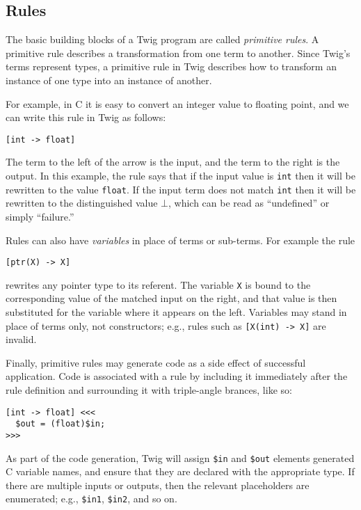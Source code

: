 \subsection{Rules}

The basic building blocks of a Twig program are called \emph{primitive rules}. A primitive rule describes a transformation from one term to another. Since Twig's terms represent types, a primitive rule in Twig describes how to transform an instance of one type into an instance of another.

For example, in C it is easy to convert an integer value to floating point, and we can write this rule in Twig as follows:

\begin{verbatim}
[int -> float]
\end{verbatim}

The term to the left of the arrow is the input, and the term to the right is the output. In this example, the rule says that if the input value is \texttt{int} then it will be rewritten to the value \texttt{float}. If the input term does not match \texttt{int} then it will be rewritten to the distinguished value $\bot$, which can be read as ``undefined'' or simply ``failure.''

Rules can also have \emph{variables} in place of terms or sub-terms. For example the rule

\begin{verbatim}
[ptr(X) -> X]
\end{verbatim}

rewrites any pointer type to its referent. The variable \texttt{X} is bound to the corresponding value of the matched input on the right, and that value is then substituted for the variable where it appears on the left. Variables may stand in place of terms only, not constructors; e.g., rules such as \texttt{[X(int) -> X]} are invalid.

Finally, primitive rules may generate code as a side effect of successful application. Code is associated with a rule by including it immediately after the rule definition and surrounding it with triple-angle brances, like so:

\begin{verbatim}
[int -> float] <<<
  $out = (float)$in;
>>>
\end{verbatim}

As part of the code generation, Twig will assign \texttt{\$in} and \texttt{\$out} elements generated C variable names, and ensure that they are declared with the appropriate type. If there are multiple inputs or outputs, then the relevant placeholders are enumerated; e.g., \texttt{\$in1}, \texttt{\$in2}, and so on.

